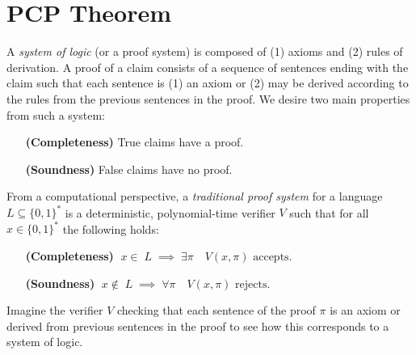\documentclass{article}
\newtheorem{definition}[theorem]{Definition}
\newcommand{\bits}{\{0,1\}}
\newcommand{\class}[1]{\mathbf{#1}}
\newcommand{\NP}{\class{NP}}
\begin{document}

\section{PCP Theorem}\label{pcp}

A \emph{system of logic} (or a proof system) is composed of (1) axioms
and (2) rules of derivation.
A proof of a claim consists of a sequence of sentences ending with the claim
such that each sentence is (1) an axiom or (2) may be derived according to the rules
from the previous sentences in the proof.
We desire two main properties from such a system:
\begin{itemize}[leftmargin=10em]
\item[\textbf{(Completeness)}] True claims have a proof.
\item[\textbf{(Soundness)}] False claims have no proof.
\end{itemize}

%

From a computational perspective, a \emph{traditional proof system} for a
language $L \subseteq \bits^*$ is a deterministic, polynomial-time verifier $V$
such that for all $x \in \bits^*$ the following holds:
\begin{itemize}[leftmargin=10em]
\item[\textbf{(Completeness)}] $\;x \in\; L \;\implies\; \exists \pi \quad V(x, \pi) \text{ accepts}$.
\item[\textbf{(Soundness)}] $\;x \notin\; L \;\implies\; \forall \pi \quad V(x, \pi) \text{ rejects}$.
\end{itemize}
Imagine the verifier $V$ checking that each sentence of the proof $\pi$
is an axiom or derived from previous sentences in the proof to see how
this corresponds to a system of logic.
\end{document}
